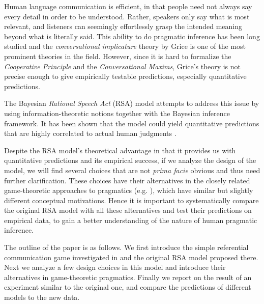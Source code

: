 Human language communication is efficient, in that people need not always say every detail in order to be understood. Rather, speakers only say what is most relevant, and listeners can seemingly effortlessly grasp the intended meaning beyond what is literally said. This ability to do pragmatic inference has been long studied and the \emph{conversational implicature} theory by Grice \cite{Grice} is one of the most prominent theories in the field. However, since it is hard to formalize the \emph{Cooperative Principle} and the \emph{Conversational Maxims}, Grice's theory is not precise enough to give empirically testable predictions, especially quantitative predictions.

The Bayesian \emph{Rational Speech Act} (RSA) model attempts to address this issue by using information-theoretic notions together with the Bayesian inference framework. It has been shown that the model could yield quantitative predictions that are highly correlated to actual human judgments \cite{Frank}.

Despite the RSA model's theoretical advantage in that it provides us with quantitative predictions and its empirical success, if we analyze the design of the model, we will find several choices that are not \emph{prima facie} obvious and thus need further clarification. These choices have their alternatives in the closely related game-theoretic approaches to pragmatics (e.g. \cite{Benz2007,Jager2013}), which have similar but slightly different conceptual motivations. Hence it is important to systematically compare the original RSA model with all these alternatives and test their predictions on empirical data, to gain a better understanding of the nature of human pragmatic inference.

The outline of the paper is as follows. We first introduce the simple referential communication game investigated in \cite{Frank} and the original RSA model proposed there. Next we analyze a few design choices in this model and introduce their alternatives in game-theoretic pragmatics. Finally we report on the result of an experiment similar to the original one, and compare the predictions of different models to the new data.